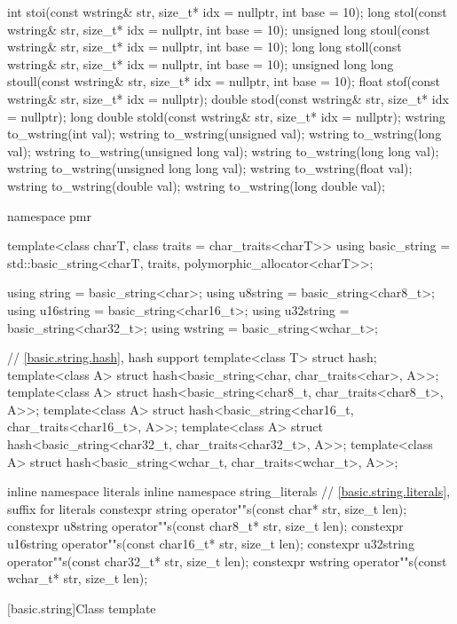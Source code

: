 \begin{codeblock}
{  int stoi(const wstring& str, size_t* idx = nullptr, int base = 10);
  long stol(const wstring& str, size_t* idx = nullptr, int base = 10);
  unsigned long stoul(const wstring& str, size_t* idx = nullptr, int base = 10);
  long long stoll(const wstring& str, size_t* idx = nullptr, int base = 10);
  unsigned long long stoull(const wstring& str, size_t* idx = nullptr, int base = 10);
  float stof(const wstring& str, size_t* idx = nullptr);
  double stod(const wstring& str, size_t* idx = nullptr);
  long double stold(const wstring& str, size_t* idx = nullptr);
  wstring to_wstring(int val);
  wstring to_wstring(unsigned val);
  wstring to_wstring(long val);
  wstring to_wstring(unsigned long val);
  wstring to_wstring(long long val);
  wstring to_wstring(unsigned long long val);
  wstring to_wstring(float val);
  wstring to_wstring(double val);
  wstring to_wstring(long double val);

  namespace pmr {
    template<class charT, class traits = char_traits<charT>>
      using basic_string = std::basic_string<charT, traits, polymorphic_allocator<charT>>;

    using string    = basic_string<char>;
    using u8string  = basic_string<char8_t>;
    using u16string = basic_string<char16_t>;
    using u32string = basic_string<char32_t>;
    using wstring   = basic_string<wchar_t>;
  }

  // \ref{basic.string.hash}, hash support
  template<class T> struct hash;
  template<class A> struct hash<basic_string<char, char_traits<char>, A>>;
  template<class A> struct hash<basic_string<char8_t, char_traits<char8_t>, A>>;
  template<class A> struct hash<basic_string<char16_t, char_traits<char16_t>, A>>;
  template<class A> struct hash<basic_string<char32_t, char_traits<char32_t>, A>>;
  template<class A> struct hash<basic_string<wchar_t, char_traits<wchar_t>, A>>;

  inline namespace literals {
  inline namespace string_literals {
    // \ref{basic.string.literals}, suffix for  literals
    constexpr string    operator""s(const char* str, size_t len);
    constexpr u8string  operator""s(const char8_t* str, size_t len);
    constexpr u16string operator""s(const char16_t* str, size_t len);
    constexpr u32string operator""s(const char32_t* str, size_t len);
    constexpr wstring   operator""s(const wchar_t* str, size_t len);
  }
  }
}
\end{codeblock}

[basic.string]{Class template }

